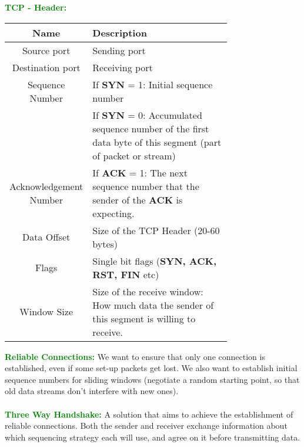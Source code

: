 \documentclass[a4paper,10pt]{article}
\begin{document}
\newpage
\noindent \textcolor{Green}{\textbf{TCP - Header:}}
\begin{center}
	\begin{tabular}{ |c|p{0.75\linewidth}| }
		\hline 
		\textbf{Name} &\textbf{Description} \\
		\hline 
		\hline 
		Source port &Sending port \\
		\hline
		Destination port &Receiving port \\
		\hline 
		Sequence Number &If \textbf{SYN} = 1: Initial sequence number \\
						&If \textbf{SYN} = 0: Accumulated sequence number of the first data byte of this segment (part of packet or stream)\\
		\hline
		Acknowledgement Number &If \textbf{ACK} = 1: The next sequence number that the sender of the \textbf{ACK} is expecting. \\
		\hline 
		Data Offset &Size of the TCP Header (20-60 bytes) \\
		\hline 
		Flags &Single bit flags (\textbf{SYN, ACK, RST, FIN} etc) \\
		\hline
		Window Size &Size of the receive window: How much data the sender of this segment is willing to receive. \\ 
		\hline
	\end{tabular}
\end{center}
\textcolor{Green}{\textbf{Reliable Connections:}} We want to ensure that only one connection is established, even if some set-up packets get lost. We also want to establish initial sequence numbers for sliding windows (negotiate a random starting point, so that old data streams don't interfere with new ones). \\\\
\textcolor{Green}{\textbf{Three Way Handshake:}} A solution that aims to achieve the establishment of reliable connections. Both the sender and receiver exchange information about which sequencing strategy each will use, and agree on it before transmitting data.
\end{document}
